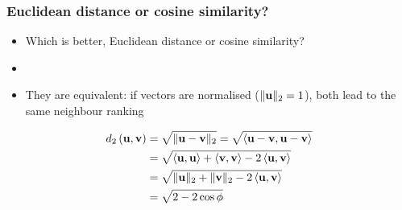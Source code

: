 \documentclass[t]{beamer} %
\begin{document}
\begin{frame}[fragile]
  \frametitle{Euclidean distance or cosine similarity?}

  \begin{itemize}
  \item Which is better, Euclidean distance or cosine similarity?
  \item[]
  \item<2-> They are equivalent: if vectors are normalised ($\norm[2]{\vu} = 1$),
    both lead to the same neighbour ranking
  \end{itemize}

  \begin{align*}
    \dist[2]{\vu}{\vv} 
    &= \sqrt{\norm[2]{\vu - \vv}}
    = \sqrt{\sprod{\vu - \vv}{\vu - \vv}}
    \\
    &= \sqrt{\sprod{\vu}{\vu} + \sprod{\vv}{\vv} - 2 \sprod{\vu}{\vv}}
    \\
    &= \sqrt{\norm[2]{\vu} + \norm[2]{\vv} - 2 \sprod{\vu}{\vv}}
    \\
    &= \sqrt{2 - 2 \cos \phi}
  \end{align*}
\end{frame}

\end{document}
